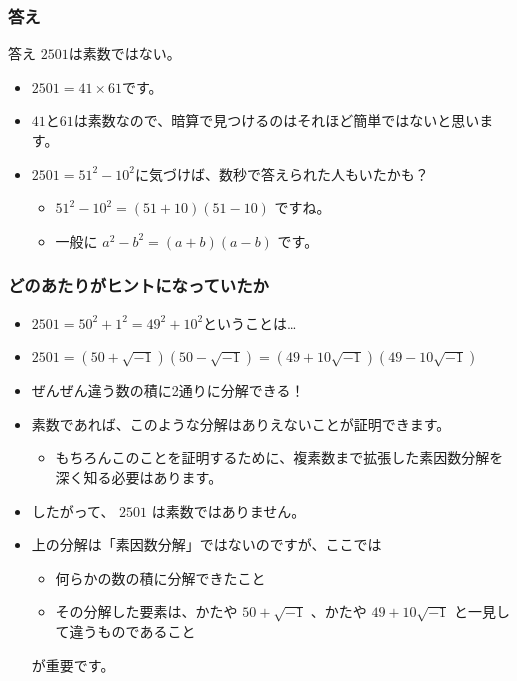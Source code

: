 \documentclass[dvipdfmx]{beamer}
\begin{document}
  \begin{frame}
    \frametitle{答え}

    \begin{block}{答え}
      $2501$は素数ではない。
    \end{block}
    \begin{itemize}
      \item $2501 = 41 \times 61$です。
      \item $41$と$61$は素数なので、暗算で見つけるのはそれほど簡単ではないと思います。
      \item $2501 = 51^2 - 10^2$に気づけば、数秒で答えられた人もいたかも？
      \begin{itemize}
        \item $51^2 - 10^2 = (51+10)(51-10)$ ですね。
        \item 一般に $a^2 - b^2 = (a+b)(a-b)$ です。
      \end{itemize}
    \end{itemize}

  \end{frame}

  \begin{frame}
    \frametitle{どのあたりがヒントになっていたか}

    \begin{itemize}
      \item $2501 = 50^2 + 1^2 = 49^2 + 10^2$ということは…
      \item $2501 = (50+\sqrt{-1})(50-\sqrt{-1}) = (49+10\sqrt{-1})(49-10\sqrt{-1})$
      \item \alert{ぜんぜん違う数の積に2通りに分解}できる！
      \item 素数であれば、このような分解はありえないことが証明できます。
      \begin{itemize}
        \item もちろんこのことを証明するために、複素数まで拡張した素因数分解を深く知る必要はあります。
      \end{itemize}
      \item したがって、 $2501$ は素数ではありません。
      \item 上の分解は「素因数分解」ではないのですが、ここでは
      \begin{itemize}
        \item 何らかの数の積に分解できたこと
        \item その分解した要素は、かたや $50+\sqrt{-1}$ 、かたや $49+10\sqrt{-1}$ と一見して違うものであること
      \end{itemize}
      が重要です。
    \end{itemize}

  \end{frame}
\end{document}
